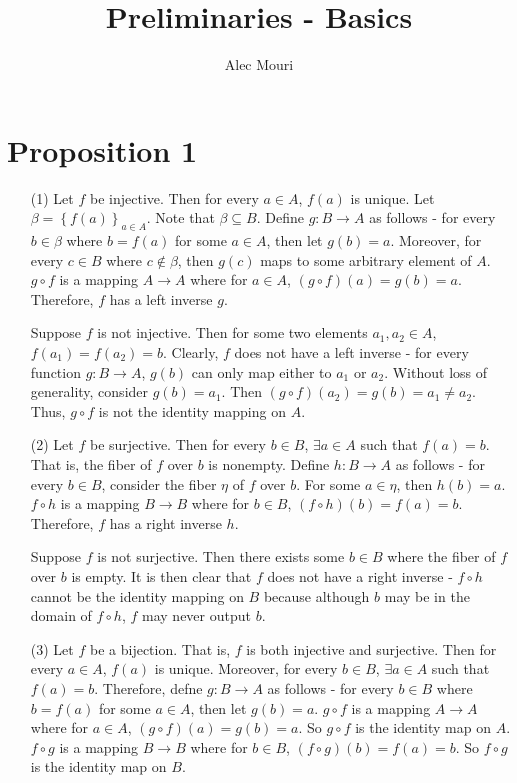 \documentclass[12pt]{article}
\begin{document}
\title{Preliminaries - Basics}
\author{Alec Mouri}

\maketitle
\section*{Proposition 1}
\begin{itemize}
\item[(1)] Let $f$ be injective. Then for every $a \in A$, $f(a)$ is unique. Let $\beta = \left\lbrace f(a) \right\rbrace_{a \in A}$. Note that $\beta \subseteq B$. Define $g : B \rightarrow A$ as follows - for every $b \in \beta$ where $b = f(a)$ for some $a \in A$, then let $g(b) = a$. Moreover, for every $c \in B$ where $c \not \in \beta$, then $g(c)$ maps to some arbitrary element of $A$. $g \circ f$ is a mapping $A \rightarrow A$ where for $a \in A$, $(g \circ f)(a) = g(b) = a$. Therefore, $f$ has a left inverse $g$.

Suppose $f$ is not injective. Then for some two elements $a_1, a_2 \in A$, $f(a_1) = f(a_2) = b$. Clearly, $f$ does not have a left inverse - for every function $g : B \rightarrow A$, $g(b)$ can only map either to $a_1$ or $a_2$. Without loss of generality, consider $g(b) = a_1$. Then $(g \circ f)(a_2) = g(b) = a_1 \neq a_2$. Thus, $g \circ f$ is not the identity mapping on $A$.

\item[(2)] Let $f$ be surjective. Then for every $b \in B$, $\exists a \in A$ such that $f(a) = b$. That is, the fiber of $f$ over $b$ is nonempty. Define $h : B \rightarrow A$ as follows - for every $b \in B$, consider the fiber $\eta$ of $f$ over $b$. For some $a \in \eta$, then $h(b) = a$. $f \circ h$ is a mapping $B \rightarrow B$ where for $b \in B$, $(f \circ h)(b) = f(a) = b$. Therefore, $f$ has a right inverse $h$.

Suppose $f$ is not surjective. Then there exists some $b \in B$ where the fiber of $f$ over $b$ is empty. It is then clear that $f$ does not have a right inverse - $f \circ h$ cannot be the identity mapping on $B$ because although $b$ may be in the domain of $f \circ h$, $f$ may never output $b$.

\item[(3)] Let $f$ be a bijection. That is, $f$ is both injective and surjective. Then for every $a \in A$, $f(a)$ is unique. Moreover, for every $b \in B$, $\exists a \in A$ such that $f(a) = b$. Therefore, defne $g : B \rightarrow A$ as follows - for every $b \in B$ where $b = f(a)$ for some $a \in A$, then let $g(b) = a$. $g \circ f$ is a mapping $A \rightarrow A$ where for $a \in A$, $(g \circ f)(a) = g(b) = a$. So $g \circ f$ is the identity map on $A$. $f \circ g$ is a mapping $B \rightarrow B$ where for $b \in B$, $(f \circ g)(b) = f(a) = b$. So $f \circ g$ is the identity map on $B$.


\end{itemize}
\end{document}
